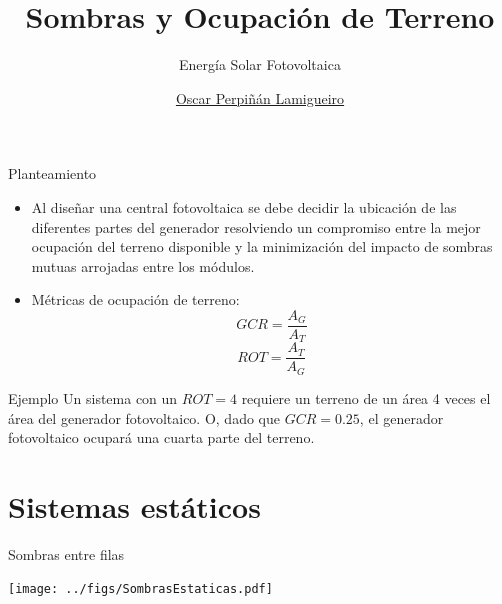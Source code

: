 \documentclass[aspectratio=169, usenames,svgnames,dvipsnames]{beamer}
\author{\href{https://oscarperpinan.github.io}{Oscar Perpiñán Lamigueiro}}
\date{}
\title{Sombras y Ocupación de Terreno}
\subtitle{Energía Solar Fotovoltaica}
\institute[UPM]{Universidad Politécnica de Madrid}
\begin{document}
\maketitle

\begin{frame}[label={sec:orgbaaa9f1}]{Planteamiento}
\begin{itemize}
\item Al diseñar una central fotovoltaica se debe decidir la ubicación de las diferentes partes del generador resolviendo un \alert{compromiso} entre la mejor \alert{ocupación del terreno} disponible y la minimización del \alert{impacto de sombras mutuas} arrojadas entre los módulos.
\item Métricas de ocupación de terreno:
\[GCR = \frac{A_G}{A_T}\]
\[ROT = \frac{A_T}{A_G}\]
\end{itemize}
\begin{block}{Ejemplo}
Un sistema con un \(ROT = 4\) requiere un terreno de un área 4 veces el área del generador fotovoltaico. O, dado que \(GCR = 0.25\), el generador fotovoltaico ocupará una cuarta parte del terreno.
\end{block}
\end{frame}

\section{Sistemas estáticos}
\label{sec:org44514b3}

\begin{frame}[label={sec:orgd8365b1}]{Sombras entre filas}
\begin{center}
\texttt{[image: ../figs/SombrasEstaticas.pdf]}
\end{center}
\end{frame}
\end{document}
